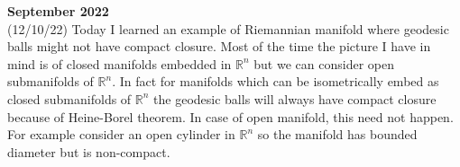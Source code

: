 \documentclass[12pt,a4paper]{article}
\newcommand{\R}{\mathbb{R}}
\begin{document}
	\maketitle\textbf{September 2022}
\\

   (12/10/22) Today I learned an example of Riemannian manifold where geodesic balls might not have compact closure. Most of the time the picture I have in mind is of closed manifolds embedded in $ \R^{n} $ but we can consider open submanifolds of $ \R^{n} $. In fact for manifolds which can be isometrically embed as closed submanifolds of $ \R^{n} $ the geodesic balls will always have compact closure because of Heine-Borel theorem. In case of open manifold, this need not happen. For example consider an open cylinder in $ \R^{n} $ so the manifold has bounded diameter but is non-compact. 
\end{document}
